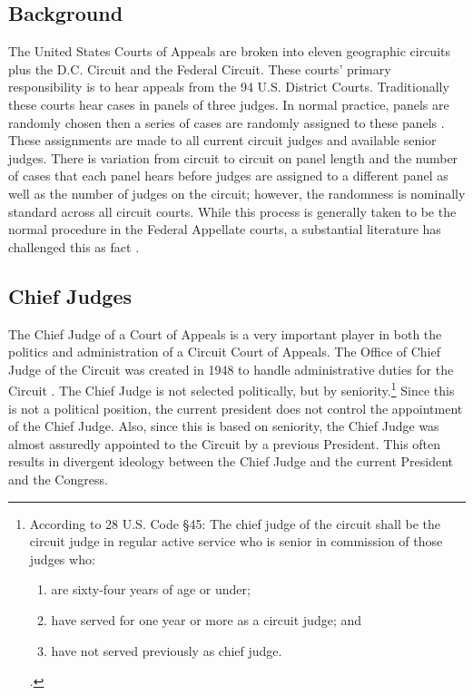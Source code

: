 \documentclass[12pt]{article}
\begin{document}
\subsection*{Background}
The United States Courts of Appeals are broken into eleven geographic circuits plus the D.C. Circuit and the Federal Circuit. These courts' primary responsibility is to hear appeals from the 94 U.S. District Courts. Traditionally these courts hear cases in panels of three judges. In normal practice, panels are randomly chosen then a series of cases are randomly assigned to these panels \citep{Hooper2011,Journalist2011,Chilton2014,Songer2007}.  These assignments are made to all current circuit judges and available senior judges. There is variation from circuit to circuit on panel length and the number of cases that each panel hears before judges are assigned to a different panel as well as the number of judges on the circuit; however, the randomness is nominally standard across all circuit courts.  While this process is generally taken to be the normal procedure in the Federal Appellate courts, a substantial literature has challenged this as fact \citep{Atkins1974,Brown2000,Chilton2014}.  

\subsection*{Chief Judges}
The Chief Judge of a Court of Appeals is a very important player in both the politics and administration of a Circuit Court of Appeals.  The Office of Chief Judge of the Circuit was created in 1948 to handle administrative duties for the Circuit \citep{feinberg1984office}.  The Chief Judge is not selected politically, but by seniority.\footnote{According to 28 U.S. Code \S45: The chief judge of the circuit shall be the circuit judge in regular active service who is senior in commission of those judges who:
	\begin{enumerate}[label=(\Alph*)]
	\item are sixty-four years of age or under;
	\item have served for one year or more as a circuit judge; and
	\item have not served previously as chief judge.
\end{enumerate} \citep{Journalist2011}.}  Since this is not a political position, the current president does not control the appointment of the Chief Judge.  Also, since this is based on seniority, the Chief Judge was almost assuredly appointed to the Circuit by a previous President.  This often results in divergent ideology between the Chief Judge and the current President and the Congress.
\end{document}
